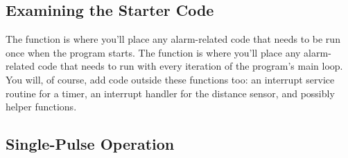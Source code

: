 


\subsection{Examining the Starter Code}

The  function is where you'll place any alarm-related code that needs to be run once when the program starts.
The  function is where you'll place any alarm-related code that needs to run with every iteration of the program's main loop.
You will, of course, add code outside these functions too: an interrupt service routine for a timer, an interrupt handler for the distance sensor, and possibly helper functions.

\subsection{Single-Pulse Operation} \label{subsec:distanceSinglePulseOperation}

\begin{description}
\end{description}

